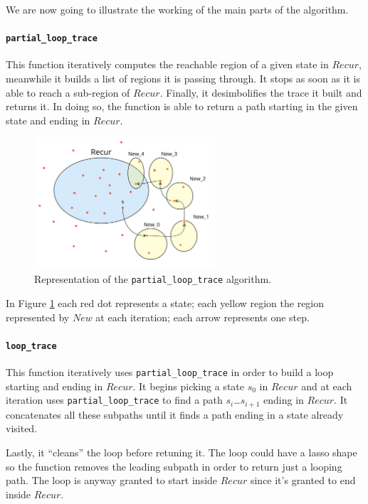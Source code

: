 \documentclass[12pt]{article}
\begin{document}
    We are now going to illustrate the working of the main parts of the algorithm.

    \paragraph*{\texttt{partial\_loop\_trace}}
    This function iteratively computes the reachable region of a given state in $Recur$, meanwhile it builds a list of regions it is passing through.
    It stops as soon as it is able to reach a sub-region of $Recur$.
    Finally, it desimbolifies the trace it built and returns it.
    In doing so, the function is able to return a path starting in the given state and ending in $Recur$.

    \begin{figure}[H] 
        \centering
        \includegraphics[width=0.6\textwidth]{partial_loop_trace.jpg}
        \caption{Representation of the \texttt{partial\_loop\_trace} algorithm.}
        \label{fig:partial_loop_trace}
    \end{figure}

    In Figure \ref{fig:partial_loop_trace} each red dot represents a state; each yellow region the region represented by $New$ at each iteration; each arrow represents one step.
            
    \paragraph*{\texttt{loop\_trace}}
    This function iteratively uses \texttt{partial\_loop\_trace} in order to build a loop starting and ending in $Recur$.
    It begins picking a state $s_0$ in $Recur$ and at each iteration uses \texttt{partial\_loop\_trace} to find a path $s_i$\dots$s_{i+1}$ ending in $Recur$.
    It concatenates all these subpaths until it finds a path ending in a state already visited.

    Lastly, it ``cleans'' the loop before retuning it.
    The loop could have a lasso shape so the function removes the leading subpath in order to return just a looping path.
    The loop is anyway granted to start inside $Recur$ since it's granted to end inside $Recur$.
\end{document}
